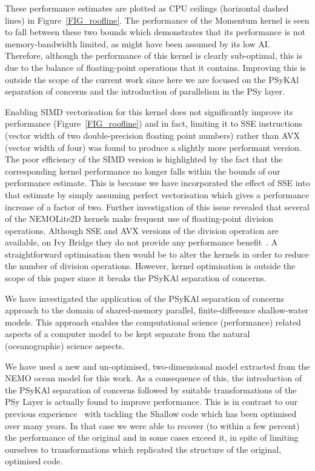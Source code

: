 \documentclass[gmd, manuscript]{copernicus}
\begin{document}
These performance estimates are plotted as CPU ceilings (horizontal
dashed lines) in Figure~\ref{FIG_roofline}. The performance of the
Momentum kernel is seen to fall between these two bounds which
demonstrates that its performance is not memory-bandwidth limited, as
might have been assumed by its low AI. Therefore, although the
performance of this kernel is clearly sub-optimal, this is due to the
balance of floating-point operations that it contains. Improving this
is outside the scope of the current work since here we are focused on
the {PS}y{KA}l separation of concerns and the introduction of parallelism
in the PSy layer.

Enabling SIMD vectorisation for this kernel does not significantly
improve its performance (Figure~\ref{FIG_roofline}) and in fact,
limiting it to SSE instructions (vector width of two double-precision
floating point numbers) rather than AVX (vector width of four) was
found to produce a slightly more performant version. The poor
efficiency of the SIMD version is highlighted by the fact that the
corresponding kernel performance no longer falls within the bounds of
our performance estimate. This is because we have incorporated the
effect of SSE into that estimate by simply assuming perfect
vectorisation which gives a performance increase of a factor of two.
Further investigation of this issue revealed that several of the
NEMOLite2D kernels make frequent use of floating-point division
operations. Although SSE and AVX versions of the division operation
are available, on Ivy Bridge they do not provide any performance
benefit~\citep{fog_instructions}. A straightforward optimisation then
would be to alter the kernels in order to reduce the number of
division operations. However, kernel optimisation is outside the scope
of this paper since it breaks the PSyKAl separation of concerns.


\conclusions

We have investigated the application of the {PS}y{KA}l separation of
concerns approach to the domain of shared-memory parallel,
finite-difference shallow-water models. This approach enables the
computational science (performance) related aspects of a computer
model to be kept separate from the natural (oceanographic) science
aspects.

We have used a new and un-optimised, two-dimensional model extracted
from the NEMO ocean model for this work. As a consequence of this, the
introduction of the {PS}y{KA}l separation of concerns followed by
suitable transformations of the PSy Layer is actually found to improve
performance. This is in contrast to our previous
experience~\citep{shallow_psykal} with tackling the Shallow code which
has been optimised over many years. In that case we were able to
recover (to within a few percent) the performance of the original and
in some cases exceed it, in spite of limiting ourselves to
transformations which replicated the structure of the original,
optimised code.
\end{document}
